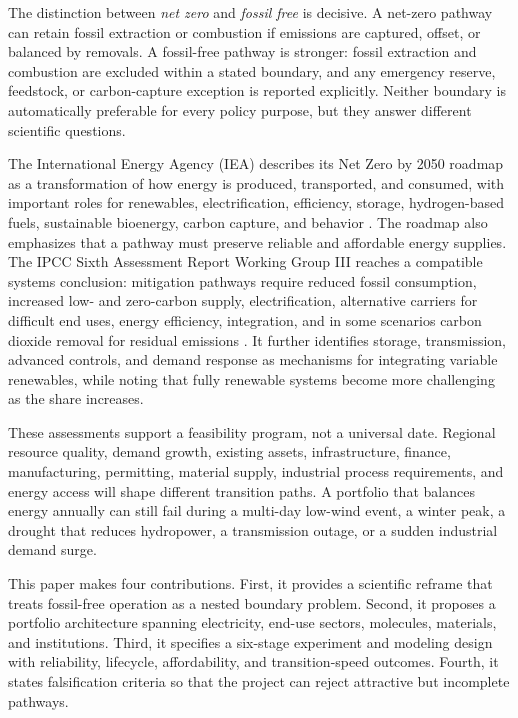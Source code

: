 \documentclass[conference]{IEEEtran}
\begin{document}
The distinction between \emph{net zero} and \emph{fossil free} is decisive. A net-zero pathway can retain fossil extraction or combustion if emissions are captured, offset, or balanced by removals. A fossil-free pathway is stronger: fossil extraction and combustion are excluded within a stated boundary, and any emergency reserve, feedstock, or carbon-capture exception is reported explicitly. Neither boundary is automatically preferable for every policy purpose, but they answer different scientific questions.

The International Energy Agency (IEA) describes its Net Zero by 2050 roadmap as a transformation of how energy is produced, transported, and consumed, with important roles for renewables, electrification, efficiency, storage, hydrogen-based fuels, sustainable bioenergy, carbon capture, and behavior \cite{iea_nz}. The roadmap also emphasizes that a pathway must preserve reliable and affordable energy supplies. The IPCC Sixth Assessment Report Working Group III reaches a compatible systems conclusion: mitigation pathways require reduced fossil consumption, increased low- and zero-carbon supply, electrification, alternative carriers for difficult end uses, energy efficiency, integration, and in some scenarios carbon dioxide removal for residual emissions \cite{ipcc_wg3}. It further identifies storage, transmission, advanced controls, and demand response as mechanisms for integrating variable renewables, while noting that fully renewable systems become more challenging as the share increases.

These assessments support a feasibility program, not a universal date. Regional resource quality, demand growth, existing assets, infrastructure, finance, manufacturing, permitting, material supply, industrial process requirements, and energy access will shape different transition paths. A portfolio that balances energy annually can still fail during a multi-day low-wind event, a winter peak, a drought that reduces hydropower, a transmission outage, or a sudden industrial demand surge.

This paper makes four contributions. First, it provides a scientific reframe that treats fossil-free operation as a nested boundary problem. Second, it proposes a portfolio architecture spanning electricity, end-use sectors, molecules, materials, and institutions. Third, it specifies a six-stage experiment and modeling design with reliability, lifecycle, affordability, and transition-speed outcomes. Fourth, it states falsification criteria so that the project can reject attractive but incomplete pathways.
\end{document}
